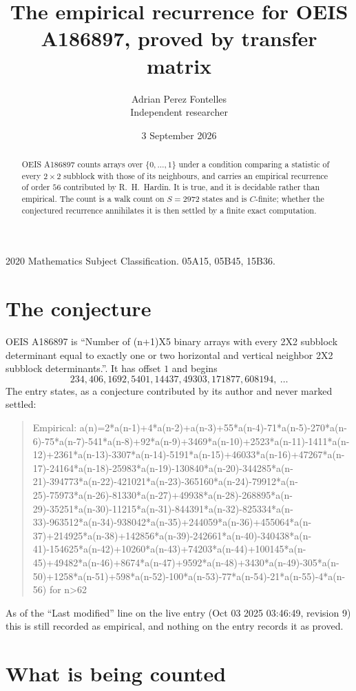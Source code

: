 \documentclass[11pt,a4paper]{article}
\title{The empirical recurrence for OEIS A186897, proved by transfer matrix}
\author{Adrian Perez Fontelles\\ \small Independent researcher}
\date{3 September 2026}
\theoremstyle{plain}
\theoremstyle{definition}
\begin{document}
\maketitle

\begin{abstract}
OEIS A186897 counts arrays over $\{0,\dots,1\}$ under a condition comparing a statistic of
every $2\times2$ subblock with those of its neighbours, and carries an empirical recurrence
of order $56$ contributed by R.~H.~Hardin. It is true, and it is decidable rather than
empirical. The count is a walk count on $S=2972$ states and is $C$-finite; whether the
conjectured recurrence annihilates it is then settled by a finite exact computation.
\end{abstract}

\noindent\small 2020 Mathematics Subject Classification. 05A15, 05B45, 15B36.\normalsize

\section{The conjecture}

OEIS A186897 is ``Number of (n+1)X5 binary arrays with every 2X2 subblock determinant equal to exactly one or two horizontal and vertical neighbor 2X2 subblock determinants.''. It has offset $1$ and begins
\[
234, 406, 1692, 5401, 14437, 49303, 171877, 608194,\ \dots
\]
The entry states, as a conjecture contributed by its author and never marked settled:
\begin{quote}
Empirical: a(n)=2*a(n-1)+4*a(n-2)+a(n-3)+55*a(n-4)-71*a(n-5)-270*a(n-6)-75*a(n-7)-541*a(n-8)+92*a(n-9)+3469*a(n-10)+2523*a(n-11)-1411*a(n-12)+2361*a(n-13)-3307*a(n-14)-5191*a(n-15)+46033*a(n-16)+47267*a(n-17)-24164*a(n-18)-25983*a(n-19)-130840*a(n-20)-344285*a(n-21)-394773*a(n-22)-421021*a(n-23)-365160*a(n-24)-79912*a(n-25)-75973*a(n-26)-81330*a(n-27)+49938*a(n-28)-268895*a(n-29)-35251*a(n-30)-11215*a(n-31)-844391*a(n-32)-825334*a(n-33)-963512*a(n-34)-938042*a(n-35)+244059*a(n-36)+455064*a(n-37)+214925*a(n-38)+142856*a(n-39)-242661*a(n-40)-340438*a(n-41)-154625*a(n-42)+10260*a(n-43)+74203*a(n-44)+100145*a(n-45)+49482*a(n-46)+8674*a(n-47)+9592*a(n-48)+3430*a(n-49)-305*a(n-50)+1258*a(n-51)+598*a(n-52)-100*a(n-53)-77*a(n-54)-21*a(n-55)-4*a(n-56) for n>62
\end{quote}
As of the ``Last modified'' line on the live entry (Oct 03 2025 03:46:49, revision 9) this is still
recorded as empirical, and nothing on the entry records it as proved.

\section{What is being counted}
\end{document}
